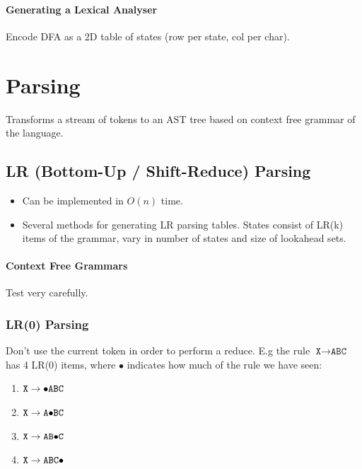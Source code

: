 \documentclass[twocolumn,english]{article}
\begin{document}
\paragraph{Generating a Lexical Analyser}

Encode DFA as a 2D table of states (row per state, col per char).

\section{Parsing}

Transforms a stream of tokens to an AST tree based on context free
grammar of the language.

\subsection{LR (Bottom-Up / Shift-Reduce) Parsing}
\begin{itemize}
\item Can be implemented in $O(n)$ time. 
\item Several methods for generating LR parsing tables. States consist of
LR(k) items of the grammar, vary in number of states and size of lookahead
sets. 
\end{itemize}

\paragraph{Context Free Grammars}

Test very carefully.

\subsubsection{LR(0) Parsing}

Don't use the current token in order to perform a reduce. E.g the
rule $\texttt{X}\rightarrow\texttt{ABC}$ has 4 LR(0) items, where
$\bullet$ indicates how much of the rule we have seen: 
\begin{enumerate}
\item $\texttt{X}\rightarrow\texttt{\ensuremath{\bullet}ABC}$ 
\item $\texttt{X}\rightarrow\texttt{A\ensuremath{\bullet}BC}$ 
\item $\texttt{X}\rightarrow\texttt{AB\ensuremath{\bullet}C}$ 
\item $\texttt{X}\rightarrow\texttt{ABC\ensuremath{\bullet}}$ 
\end{enumerate}
\end{document}
